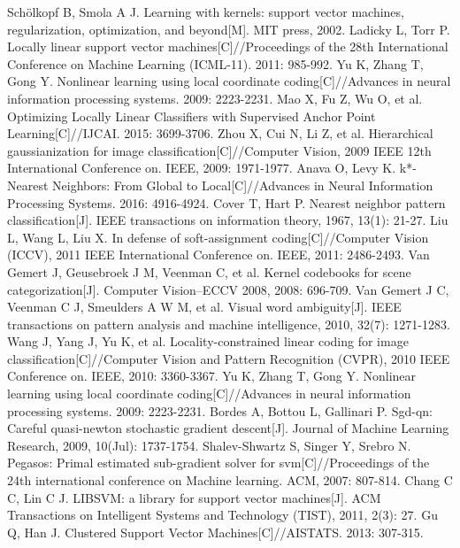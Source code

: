 \documentclass{llncs}
\begin{document}
	\begin{thebibliography}{1}
		Schölkopf B, Smola A J. Learning with kernels: support vector machines, regularization, optimization, and beyond[M]. MIT press, 2002.
		Ladicky L, Torr P. Locally linear support vector machines[C]//Proceedings of the 28th International Conference on Machine Learning (ICML-11). 2011: 985-992.
		Yu K, Zhang T, Gong Y. Nonlinear learning using local coordinate coding[C]//Advances in neural information processing systems. 2009: 2223-2231.
		Mao X, Fu Z, Wu O, et al. Optimizing Locally Linear Classifiers with Supervised Anchor Point Learning[C]//IJCAI. 2015: 3699-3706.
		Zhou X, Cui N, Li Z, et al. Hierarchical gaussianization for image classification[C]//Computer Vision, 2009 IEEE 12th International Conference on. IEEE, 2009: 1971-1977.
		Anava O, Levy K. k*-Nearest Neighbors: From Global to Local[C]//Advances in Neural Information Processing Systems. 2016: 4916-4924.
		Cover T, Hart P. Nearest neighbor pattern classification[J]. IEEE transactions on information theory, 1967, 13(1): 21-27.
		Liu L, Wang L, Liu X. In defense of soft-assignment coding[C]//Computer Vision (ICCV), 2011 IEEE International Conference on. IEEE, 2011: 2486-2493.
		Van Gemert J, Geusebroek J M, Veenman C, et al. Kernel codebooks for scene categorization[J]. Computer Vision–ECCV 2008, 2008: 696-709.
		Van Gemert J C, Veenman C J, Smeulders A W M, et al. Visual word ambiguity[J]. IEEE transactions on pattern analysis and machine intelligence, 2010, 32(7): 1271-1283.
		Wang J, Yang J, Yu K, et al. Locality-constrained linear coding for image classification[C]//Computer Vision and Pattern Recognition (CVPR), 2010 IEEE Conference on. IEEE, 2010: 3360-3367.
		Yu K, Zhang T, Gong Y. Nonlinear learning using local coordinate coding[C]//Advances in neural information processing systems. 2009: 2223-2231.
		Bordes A, Bottou L, Gallinari P. Sgd-qn: Careful quasi-newton stochastic gradient descent[J]. Journal of Machine Learning Research, 2009, 10(Jul): 1737-1754.
		Shalev-Shwartz S, Singer Y, Srebro N. Pegasos: Primal estimated sub-gradient solver for svm[C]//Proceedings of the 24th international conference on Machine learning. ACM, 2007: 807-814.
		Chang C C, Lin C J. LIBSVM: a library for support vector machines[J]. ACM Transactions on Intelligent Systems and Technology (TIST), 2011, 2(3): 27.
		Gu Q, Han J. Clustered Support Vector Machines[C]//AISTATS. 2013: 307-315.

\end{thebibliography}
\end{document}
